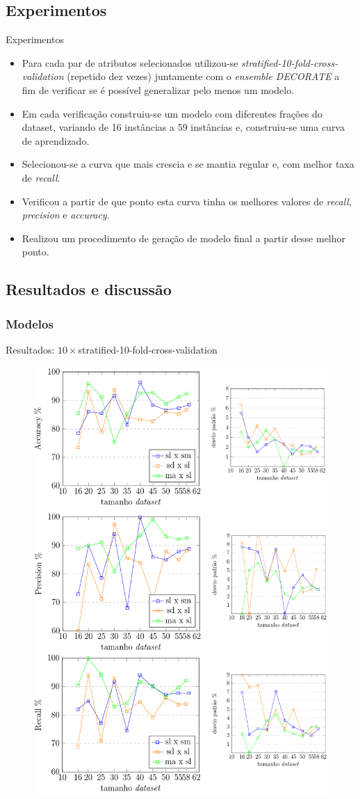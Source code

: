 \documentclass[brazil]{beamer}
\begin{document}
\subsection{Experimentos}
\begin{frame}{Experimentos}
   \begin{itemize}
\justifying
      \item <1 ->Para cada par de atributos selecionados utilizou-se \textit{stratified-10-fold-cross-validation} (repetido dez vezes) juntamente com o \textit{ensemble DECORATE} a fim de verificar se é possível generalizar pelo menos um modelo.
      \item <2 ->Em cada verificação construiu-se um modelo com diferentes frações do dataset, variando de 16 instâncias a 59 instâncias e, construiu-se uma curva de aprendizado.
      \item <3 ->Selecionou-se a curva que mais crescia e se mantia regular e, com melhor taxa de \textit{recall}.
      \item <4 ->Verificou a partir de que ponto esta curva tinha os melhores valores de \textit{recall}, \textit{precision} e \textit{accuracy}.
      \item <5 ->Realizou um procedimento de geração de modelo final a partir desse melhor ponto.
   \end{itemize}
\end{frame}


\subsection{Resultados e discussão}
\subsubsection{Modelos}
\begin{frame}{Resultados: $10\times$stratified-10-fold-cross-validation}
\begin{figure}[!htb] \centering 
  \centering
  \includegraphics[width=0.5\columnwidth]{slide/accuracy_precision_recall} 
  \caption{} 
  \label{fig:accuracy_precision_recall}
\end{figure}
\end{frame}
\end{document}
